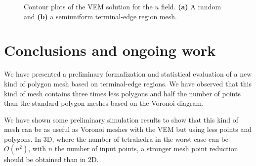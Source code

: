 \begin{figure}[!bth]
\centering     %
{} \hspace{0.5cm}
\caption{Contour plots of the VEM solution for the $u$ field. \textbf{(a)} A random and \textbf{(b)} a semiuniform terminal-edge region mesh.}
\label{figs:ContourPlots} 
\end{figure}


%
%
\section{Conclusions and ongoing work}
\label{sec:conclusions}

We have presented a preliminary formalization and  statistical evaluation of a new kind of polygon mesh based on terminal-edge regions. We have observed that this kind of mesh contains three times less polygons and half the number of points than the standard polygon meshes based on the Voronoi diagram. 

We have shown some preliminary simulation results to show that this kind of mesh can be  as useful as Voronoi meshes with the VEM but using less  points and polygons. In 3D, where the number of tetrahedra in the worst case can be $O(n^2)$, with $n$ the number of input points, a stronger mesh point reduction should be obtained than in 2D. 

